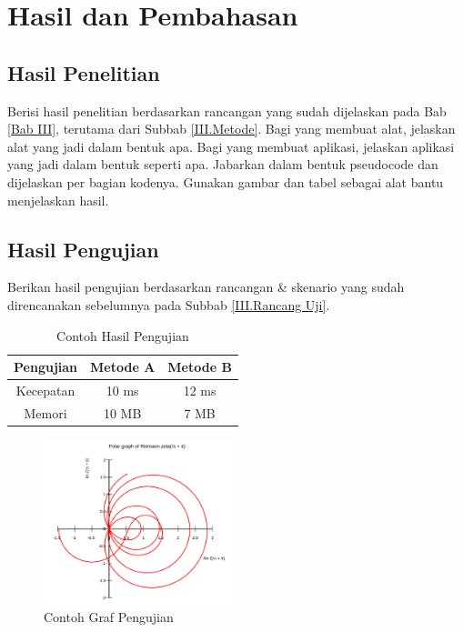 \newpage
\chapter{Hasil dan Pembahasan} \label{Bab IV}

\section{Hasil Penelitian} \label{IV.Hasil}
Berisi hasil penelitian berdasarkan rancangan yang sudah dijelaskan pada Bab \ref{Bab III}, terutama dari Subbab \ref{III.Metode}. Bagi yang membuat alat, jelaskan alat yang jadi dalam bentuk apa. Bagi yang membuat aplikasi, jelaskan aplikasi yang jadi dalam bentuk seperti apa. Jabarkan dalam bentuk pseudocode dan dijelaskan per bagian kodenya. Gunakan gambar dan tabel sebagai alat bantu menjelaskan hasil. \par

\section{Hasil Pengujian} \label{IV.Uji}
Berikan hasil pengujian berdasarkan rancangan \& skenario yang sudah direncanakan sebelumnya pada Subbab \ref{III.Rancang Uji}. \par

\begin{longtable}{|c|c|c|}
	\caption{Contoh Hasil Pengujian}
	\label{table:4.uji}\\
	\hline
	\textbf{Pengujian} & \textbf{Metode A} & \textbf{Metode B} \\
	\hline
	\endhead
	Kecepatan & 10 ms & 12 ms \\ 
	\hline
	Memori & 10 MB & 7 MB \\
	\hline
\end{longtable}

\begin{figure}[H]
	\centering
	\includegraphics[width=0.5\textwidth]{figure/zeta.png}
	\caption{Contoh Graf Pengujian}
	\label{fig:4.graf}
\end{figure}

